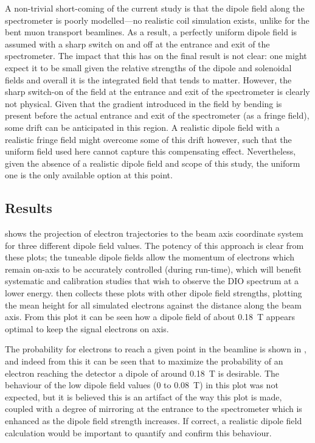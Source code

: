 A non-trivial short-coming of the current study is that the dipole field along the spectrometer is poorly modelled---no realistic coil simulation exists, unlike for the bent muon transport beamlines.
As a result, a perfectly uniform dipole field is assumed with a sharp switch on and off at the entrance and exit of the spectrometer.
The impact that this has on the final result is not clear: one might expect it to be small given the relative strengths of the dipole and solenoidal fields and overall it is the integrated field that tends to matter.
However, the sharp switch-on of the field at the entrance and exit of the spectrometer is clearly not physical.
Given that the gradient introduced in the field by bending is present before the actual entrance and exit of the spectrometer (as a fringe field), some drift can be anticipated in this region.
A realistic dipole field with a realistic fringe field might overcome some of this drift however, such that the uniform field used here cannot capture this compensating effect.
Nevertheless, given the absence of a realistic dipole field and scope of this study, the uniform one is the only available option at this point.

\subsection{Results}
\FigOptimESTDipoleBeamHeightTwoD
\FigOptimESTDipoleBeamHeightMean
{} shows the projection of electron trajectories to the beam axis coordinate system for three different dipole field values.
The potency of this approach is clear from these plots; the tuneable dipole fields allow the momentum of electrons which remain on-axis to be accurately controlled (during run-time), which will benefit systematic and calibration studies that wish to observe the \ac{DIO} spectrum at a lower energy.
 then collects these plots with other dipole field strengths, plotting the mean height for all simulated electrons against the distance along the beam axis.
From this plot it can be seen how a dipole field of about 0.18~T appears optimal to keep the signal electrons on axis.

The probability for electrons to reach a given point in the beamline is shown in , and indeed from this it can be seen that to maximize the probability of an electron reaching the detector
a dipole of around 0.18~T is desirable.
The behaviour of the low dipole field values (0 to 0.08~T) in this plot was not expected, but it is believed this is an artifact of the way this plot is made, coupled with a degree of mirroring at the entrance to the spectrometer which is enhanced as the dipole field strength increases.
If correct, a realistic dipole field calculation would be important to quantify and confirm this behaviour.
\FigOptimESTDipoleBeamFluxMean

